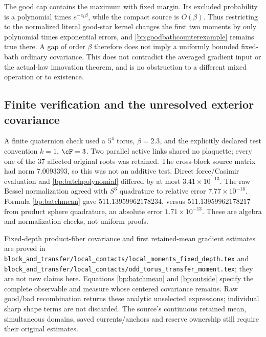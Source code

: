 The good cap contains the maximum with fixed margin. Its excluded probability is a polynomial times $e^{-c_1\beta}$, while the compact source is $O(\beta)$. Thus restricting to the normalized literal good-star kernel changes the first two moments by only polynomial times exponential errors, and \eqref{bp:goodbathcounterexample} remains true there. A gap of order $\beta$ therefore does not imply a uniformly bounded fixed-bath ordinary covariance. This does not contradict the averaged gradient input or the actual-law innovation theorem, and is no obstruction to a different mixed operation or to existence.

\subsection{Finite verification and the unresolved exterior covariance}

A finite quaternion check used a $5^4$ torus, $\beta=2.3$, and the explicitly declared test convention $k=1$, $\cF=3$. Two parallel active links shared no plaquette; every one of the $37$ affected original roots was retained. The cross-block source matrix had norm $7.0093393$, so this was not an additive test. Direct force/Casimir evaluation and \eqref{bp:batchpolynomial} differed by at most $3.41\times10^{-13}$. The raw Bessel normalization agreed with $S^3$ quadrature to relative error $7.77\times10^{-16}$. Formula \eqref{bp:batchmean} gave $511.13959962178234$, versus $511.13959962178217$ from product sphere quadrature, an absolute error $1.71\times10^{-13}$. These are algebra and normalization checks, not uniform proofs.

Fixed-depth product-fiber covariance and first retained-mean gradient estimates are proved in \texttt{block\_and\_transfer/local\_contacts/local\_moments\_fixed\_depth.tex} and \texttt{block\_and\_transfer/local\_contacts/odd\_torus\_transfer\_moment.tex}; they are not new claims here. Equations \eqref{bp:batchmean} and \eqref{bp:outside} specify the complete observable and measure whose centered covariance remains. Raw good/bad recombination returns these analytic unselected expressions; individual sharp shape terms are not discarded. The source's continuous retained mean, simultaneous domains, saved currents/anchors and reserve ownership still require their original estimates.
